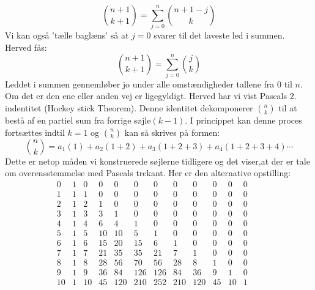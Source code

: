\[\binom{n+1}{k+1}=\sum_{j=0}^{n}\binom{n+1-j}{k}\]
Vi kan også 'tælle baglæns' så at \(j=0\) svarer til det laveste led i summen. Herved fås:
\[\binom{n+1}{k+1}=\sum_{j=0}^{n}\binom{j}{k}\]
Leddet i summen gennemløber jo under alle omstændigheder tallene fra \(0\) til \(n\). Om det er den ene eller anden vej er ligegyldigt. 
Herved har vi vist Pascals \(2\). indentitet (Hockey stick Theorem).
Denne identitet dekomponerer \(\binom{n}{k}\) til at bestå af en partiel sum fra forrige søjle\( (k-1)\). I princippet kan denne proces fortsættes indtil \(k=1\) og \(\binom{n}{k}\) kan så skrives på formen:
\[\binom{n}{k}=a_{1}(1)+a_{2}(1+2)+a_{3}(1+2+3)+a_{4}(1+2+3+4) \dotsm\]
Dette er netop måden vi konstruerede søjlerne tidligere og det viser,at der er tale om overensstemmelse med Pascals trekant.
Her er den alternative opstilling:
\begin{equation*}
\begin{array}{lllllllllllllllllll}
&0&1&0&0&0&0&0&0&0&0&0&0\\
&1&1&1&0&0&0&0&0&0&0&0&0\\
&2&1&2&1&0&0&0&0&0&0&0&0&\\
&3&1&3&3&1&0&0&0&0&0&0&0&\\
&4&1&4&6&4&1&0&0&0&0&0&0\\
&5&1&5&10&10&5&1&0&0&0&0&0&\\
&6&1&6&15&20&15&6&1&0&0&0&0&\\
&7&1&7&21&35&35&21&7&1&0&0&0\\
&8&1&8&28&56&70&56&28&8&1&0&0\\
&9&1&9&36&84&126&126&84&36&9&1&0&&&\\
&10&1&10&45&120&210&252&210&120&45&10&1
\end{array}
\end{equation*}



